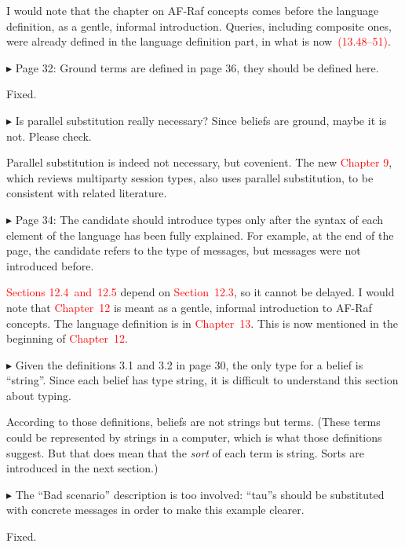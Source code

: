 \documentclass{article}
\newcommand*\R[1]{\textcolor{red}{#1}} %
\newenvironment{them}%
  {\bigskip\noindent\begingroup\color{blue}$\blacktriangleright$\enspace}%
  {\endgroup\par}
\begin{document}
I would note that the chapter on AF-Raf concepts
  comes before the language definition,
  as a gentle, informal introduction.
Queries, including composite ones,
  were already defined in the language definition part,
  in what is now~\R{(13.48--51)}.

\begin{them}
Page 32:
Ground terms are defined in page 36, they should be defined here.
\end{them}
Fixed.

\begin{them}
Is parallel substitution really necessary? Since beliefs are ground, maybe it
is not. Please check.
\end{them}

Parallel substitution is indeed not necessary, but covenient.
The new \R{Chapter 9},
  which reviews multiparty session types,
  also uses parallel substitution,
    to be consistent with related literature.


\begin{them}
Page 34:
The candidate should introduce types only after the syntax of each element of
the language has been fully explained. For example, at the end of the page, the
candidate refers to the type of messages, but messages were not introduced
before.
\end{them}

\R{Sections 12.4~and~12.5} depend on \R{Section~12.3},
  so it cannot be delayed.
I would note that \R{Chapter~12} is meant as a gentle, informal
  introduction to AF-Raf concepts.
The language definition is in \R{Chapter~13}.
This is now mentioned in the beginning of \R{Chapter~12}.

\begin{them}
Given the definitions 3.1 and 3.2 in page 30, the only type for a belief is
``string''. Since each belief has type string, it is difficult to understand this
section about typing.
\end{them}
According to those definitions,
  beliefs are not strings but terms.
(These terms could be represented by strings in a computer,
  which is what those definitions suggest.
But that does mean that the \emph{sort} of each term is string.
Sorts are introduced in the next section.)

\begin{them}
The ``Bad scenario'' description is too involved: ``tau''s should be substituted
with concrete messages in order to make this example clearer.
\end{them}
Fixed.
\end{document}
